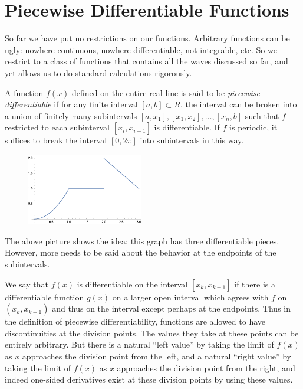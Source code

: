 \documentclass[11pt, oneside]{article}   	%
\begin{document}
\section{Piecewise Differentiable Functions}

So far we have put no restrictions on our functions. Arbitrary functions can be ugly: nowhere continuous, nowhere differentiable, not integrable, etc. So we restrict to a class of functions that contains all the waves discussed so far, and yet allows us to do standard calculations rigorously.

A function $f(x)$ defined on the entire real line is said to be {\em piecewise differentiable} if for any finite interval $[a, b] \subset R$, the interval  can be broken into a union of finitely many subintervals $[a, x_1], [x_1, x_2], \ldots, [x_n, b]$ such that $f$ restricted to each subinterval $[x_i, x_{i + 1}]$ is differentiable. If $f$ is periodic,  it suffices to break the interval $[0, 2 \pi]$ into subintervals in this way. 

\begin{figure}[htbp] %
   \centering
   \includegraphics[width=2in]{Graphics/jumps}
\end{figure}

The above picture shows the idea; this graph has three differentiable pieces. However, more needs to be said about the behavior at the endpoints of the subintervals.

We say that $f(x)$ is differentiable on the interval $[x_k, x_{k + 1}]$ if there is a differentiable function $g(x)$ on a larger open interval which agrees with $f$ on $(x_k, x_{k + 1})$ and thus on the interval except perhaps at the endpoints. Thus in the definition of piecewise differentiability, functions are allowed to have discontinuities at the division points. The values they take at these points can be entirely arbitrary. But there is a natural ``left value'' by taking the limit of 
$f(x)$ as $x$ approaches the division point from the left, and a natural ``right value'' by taking the limit of $f(x)$ as $x$ approaches the division point from the right, and indeed one-sided derivatives exist at these division points by using these values. 
\end{document}
